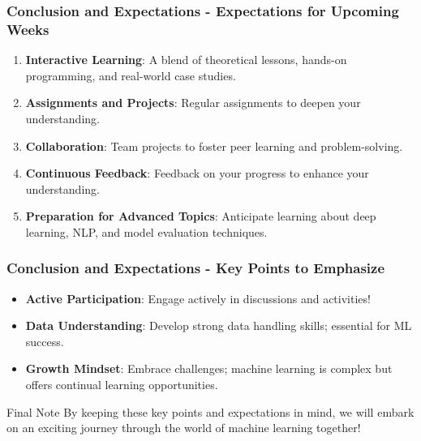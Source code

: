 \documentclass[aspectratio=169]{beamer}
\begin{document}
\begin{frame}[fragile]
  \frametitle{Conclusion and Expectations - Expectations for Upcoming Weeks}
  \begin{enumerate}
    \item \textbf{Interactive Learning}: 
      A blend of theoretical lessons, hands-on programming, and real-world case studies.

    \item \textbf{Assignments and Projects}: 
      Regular assignments to deepen your understanding.

    \item \textbf{Collaboration}: 
      Team projects to foster peer learning and problem-solving.

    \item \textbf{Continuous Feedback}: 
      Feedback on your progress to enhance your understanding.

    \item \textbf{Preparation for Advanced Topics}: 
      Anticipate learning about deep learning, NLP, and model evaluation techniques.
  \end{enumerate}
\end{frame}

\begin{frame}[fragile]
  \frametitle{Conclusion and Expectations - Key Points to Emphasize}
  \begin{itemize}
    \item \textbf{Active Participation}: Engage actively in discussions and activities!
    \item \textbf{Data Understanding}: Develop strong data handling skills; essential for ML success.
    \item \textbf{Growth Mindset}: Embrace challenges; machine learning is complex but offers continual learning opportunities.
  \end{itemize}

  \begin{block}{Final Note}
    By keeping these key points and expectations in mind, we will embark on an exciting journey through the world of machine learning together!
  \end{block}
\end{frame}
\end{document}
